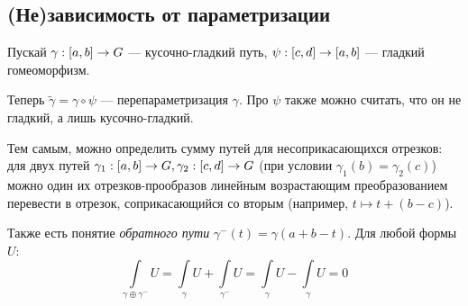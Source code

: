 \documentclass[a4paper]{report}
\begin{document}
    \subsection{(Не)зависимость от параметризации}
    Пускай $\gamma: [a, b] \rightarrow G$ --- кусочно-гладкий путь, $\psi: [c, d] \rightarrow [a, b]$ --- гладкий гомеоморфизм.

    Теперь $\tilde{\gamma} = \gamma \circ \psi$ --- перепараметризация $\gamma$.
    Про $\psi$ также можно считать, что он не гладкий, а лишь кусочно-гладкий.

    Тем самым, можно определить сумму путей для несоприкасающихся отрезков: для двух путей $\gamma_1: [a, b] \rightarrow G, \gamma_2: [c, d] \rightarrow G$ (при условии $\gamma_{1}(b) = \gamma_2(c)$) можно один их отрезков-прообразов линейным возрастающим преобразованием перевести в отрезок, соприкасающийся со вторым (например, $t \mapsto t + (b - c)$).

    Также есть понятие \emph{обратного пути} $\gamma^-(t) = \gamma(a + b - t)$.
    Для любой формы $U$: \[\int\limits_{\gamma \oplus \gamma^-}U = \int\limits_{\gamma}U + \int\limits_{\gamma^-}U = \int\limits_{\gamma}U - \int\limits_{\gamma}U = 0\]
\end{document}

